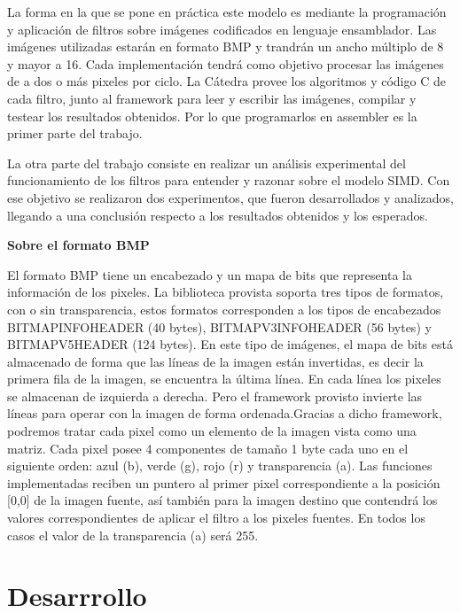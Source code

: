 \documentclass[a4paper]{article}
\begin{document}
\bigskip

La forma en la que se pone en práctica este modelo es mediante la programación y aplicación de filtros sobre imágenes codificados en lenguaje ensamblador.
Las imágenes utilizadas estarán en formato BMP y trandrán un ancho múltiplo de 8 y mayor a 16.
Cada implementación tendrá como objetivo procesar las imágenes de a dos o más pixeles por ciclo.
La Cátedra provee los algoritmos y código C de cada filtro, junto al framework para leer y escribir las imágenes, compilar y testear los resultados obtenidos. Por lo que programarlos en assembler es la primer parte del trabajo.

\bigskip

La otra parte del trabajo consiste en realizar un análisis experimental del funcionamiento de los filtros para entender y razonar sobre el modelo SIMD. Con ese objetivo se realizaron dos experimentos, que fueron desarrollados y analizados, llegando a una conclusión respecto a los resultados obtenidos y los esperados.


\bigskip

{\centering\textbf{\large{Sobre el formato BMP}}} 

\medskip

El formato BMP tiene un encabezado y un mapa de bits que representa la información de los pixeles. La biblioteca provista soporta tres tipos de formatos, con o sin transparencia, estos formatos corresponden a los tipos de encabezados BITMAPINFOHEADER (40 bytes), BITMAPV3INFOHEADER (56 bytes) y BITMAPV5HEADER (124 bytes).
En este tipo de imágenes, el mapa de bits está almacenado de forma que las líneas de la imagen están invertidas, es decir la primera fila de la imagen, se encuentra la última línea. En cada línea los pixeles se almacenan de izquierda a derecha. Pero el framework provisto invierte las líneas para operar con la imagen de forma ordenada.Gracias a dicho framework, podremos tratar cada pixel como un elemento de la imagen vista como una matriz.
Cada pixel posee 4 componentes de tamaño 1 byte cada uno en el siguiente orden: azul (b), verde (g), rojo (r) y transparencia (a).
Las funciones implementadas reciben un puntero al primer pixel correspondiente a la posición [0,0] de la imagen fuente, así también para la imagen destino que contendrá los valores  correspondientes de aplicar el filtro a los pixeles fuentes.
En todos los casos el valor de la transparencia (a) será 255.

\section{Desarrrollo}
\end{document}

